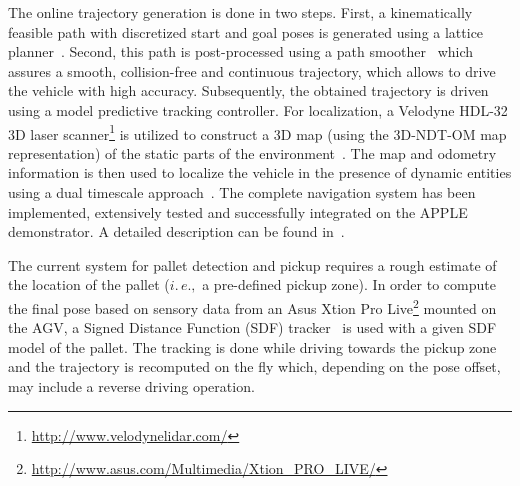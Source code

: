 The online trajectory generation is done in two steps. First, a kinematically feasible path with
discretized start and goal poses is generated using a lattice planner~\cite{Ciri14}. Second, this
path is post-processed using a path smoother~\cite{Andr15} which assures a smooth, collision-free
and continuous trajectory, which allows to drive the vehicle with high accuracy. Subsequently, the
obtained trajectory is driven using a model predictive tracking controller. For localization, a
Velodyne HDL-32 3D laser scanner\footnote{\url{http://www.velodynelidar.com/}} is utilized to
construct a 3D map (using the 3D-NDT-OM map representation) of the static parts of the
environment~\cite{Stoy13}. The map and odometry information is then used to localize the vehicle in
the presence of dynamic entities using a dual timescale approach~\cite{Vale14}. The complete
navigation system has been implemented, extensively tested and successfully integrated on the APPLE
demonstrator. A detailed description can be found in~\cite{Andr15}.

The current system for pallet detection and pickup requires a rough estimate of the location of the
pallet ($i.\,e.,$ a pre-defined pickup zone). In order to compute the final pose based on sensory
data from an Asus Xtion Pro Live\footnote{\url{http://www.asus.com/Multimedia/Xtion_PRO_LIVE/}}
mounted on the AGV, a Signed Distance Function (SDF) tracker~\cite{Cane13} is used with a given SDF
model of the pallet. The tracking is done while driving towards the pickup zone and the trajectory
is recomputed on the fly which, depending on the pose offset, may include a reverse driving
operation.
%
